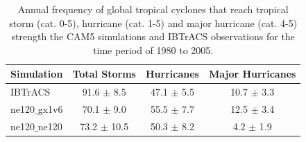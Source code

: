 \documentclass[draft,ms]{AGUTeX}
\begin{document}
\begin{table}
\caption{Annual frequency of global tropical cyclones that reach tropical storm (cat. 0-5), hurricane (cat. 1-5) and major hurricane (cat. 4-5) strength the CAM5 simulations and IBTrACS observations for the time period of 1980 to 2005.}\label{tc_counts}
\begin{tabular}{l c c c}
\hline
\textbf{Simulation} & \textbf{Total Storms} & \textbf{Hurricanes} & \textbf{Major Hurricanes}\\
\hline
IBTrACS         & 91.6 $\pm$ 8.5    & 47.1 $\pm$ 5.5 & 10.7 $\pm$ 3.3 \\
ne120$\_$gx1v6 &  70.1 $\pm$ 9.0   & 55.5 $\pm$ 7.7  & 12.5 $\pm$ 3.4\\
ne120$\_$ne120 & 73.2 $\pm$ 10.5  & 50.3 $\pm$ 8.2 & 4.2   $\pm$ 1.9 \\
\hline
\end{tabular}
\end{table}
\end{document}
